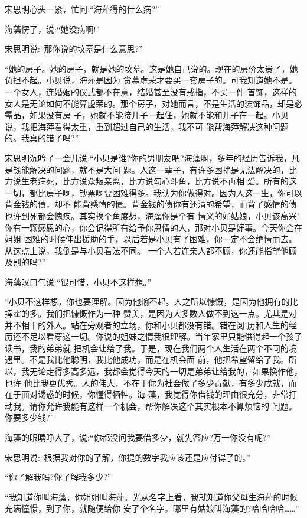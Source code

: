 \documentclass[11pt,a4paper,onecolumn]{article}
\begin{document}
宋思明心头一紧，忙问:``海萍得的什么病?''

海藻愣了，说:``她没病啊!''

宋思明说:``那你说的坟墓是什么意思?''

``她的房子。她的房子，就是她的坟墓。这是她自己说的。现在的房价太贵了，她负担不起。小贝说，海萍是因为
贪慕虚荣才要买一套房子的。可我知道她不是。一个女人，连婚姻的仪式都不在意，结婚甚至没有戒指，不买一件
首饰，这样的女人是无论如何不能算虚荣的。那个房子，对她而言，不是生活的装饰品，却是必需品，如果没有房
子，她就不能接儿子一起住，她就不能和儿子在一起。小贝说，我把海萍看得太重，重到超过自己的生活，我不可
能帮海萍解决这种问题的。我真的错了吗?''

宋思明沉吟了一会儿说:``小贝是谁?你的男朋友吧?海藻啊，多年的经历告诉我，凡是钱能解决的问题，就不是大问
题。人这一辈子，有许多困扰是无法解决的，比方说生老病死，比方说众叛亲离，比方说勾心斗角，比方说不再相
爱。所有的这一切，都比房子啊，钞票啊要困难得多。我认为你做得对。因为人这一生，你可以背金钱的债，却不
能背感情的债。背金钱的债你有还清的希望，而背了感情的债也许到死都会愧疚。其实换个角度想，海藻你是个有
情义的好姑娘，小贝该高兴!你有一颗感恩的心，你会记得所有给予你恩情的人，那对小贝是好事。今天你会在姐姐
困难的时候伸出援助的手，以后若是小贝有了困难，你一定不会绝情而去。从这点上说，我倒是与小贝看法不同。
一个人若连亲人都不顾，你还能指望他顾及别的吗?''

海藻叹口气说:``很可惜，小贝不这样想。''

``小贝不这样想，你也要理解。因为他输不起。人之所以慷慨，是因为他拥有的比挥霍的多。我们把慷慨作为一种
赞美，是因为大多数人做不到这一点。尤其是对并不相干的外人。站在旁观者的立场，你和小贝都没有错。错在阅
历和人生的经历还不足以看穿这一切。你说的姐妹之情我很理解。当年家里只能供得起一个孩子读书，我的弟弟就
把机会让给了我。于是，现在我们两个人生活在两个不同的境遇里。不是我比他聪明，我比他成功，而是在机会面
前，他把希望留给了我。所以，我无论走得多高多远，我都会觉得今天的一切是弟弟让给我的，如果换作他，也许
他比我更优秀。人的伟大，不在于你为社会做了多少贡献，有多少成就，而在于面对诱惑的时候，你懂得牺牲。海
藻，我觉得你借钱的理由很充分，非常打动我。请你允许我能有这样一个机会，帮你解决这个其实根本不算烦恼的
问题。你要多少钱?''

海藻的眼睛睁大了，说:``你都没问我要借多少，就先答应?万一你没有呢?''

宋思明说:``根据我对你的了解，你提的数字我应该还是应付得了的。''

``你了解我吗?你了解我多少?''

``我知道你叫海藻，你姐姐叫海萍。光从名字上看，我就知道你父母生海萍的时候充满憧憬，到了你，就随便给你
安了个名字。哪里有姑娘叫海藻的?哈哈哈哈……''
\end{document}
